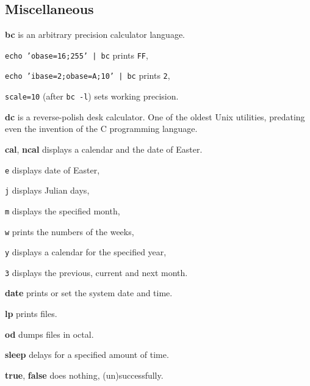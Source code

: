 \subsection{Miscellaneous}
\textbf{bc} is an arbitrary precision calculator language.
\begin{enumx}
	\item \texttt{echo 'obase=16;255' | bc} prints \texttt{FF},
	\item \texttt{echo 'ibase=2;obase=A;10' | bc} prints \texttt{2},
	\item \texttt{scale=10} (after \texttt{bc -l}) sets working precision.
\end{enumx}

\textbf{dc} is a reverse-polish desk calculator.
One of the oldest Unix utilities, 
predating even the invention of the C programming language.

\textbf{cal}, \textbf{ncal} displays a calendar and the date of Easter.
\begin{enumx}
	\item [\texttt{e}] displays date of Easter,
	\item [\texttt{j}] displays Julian days,
	\item [\texttt{m}] displays the specified month,
	\item [\texttt{w}] prints the numbers of the weeks,
	\item [\texttt{y}] displays a calendar for the specified year,
	\item [\texttt{3}] displays the previous, current and next month.
\end{enumx}

\textbf{date} prints or set the system date and time.


\textbf{lp} prints files.

\textbf{od} dumps files in octal.

\textbf{sleep} delays for a specified amount of time.

\textbf{true}, \textbf{false} does nothing, (un)successfully.

\manualbreak